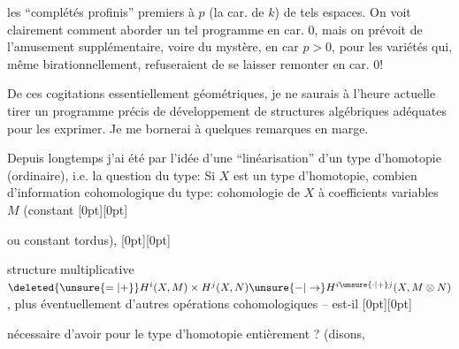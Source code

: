 %
les ``complétés profinis''  premiers à $p$ (la car. de $k$) de tels espaces. On voit clairement comment aborder un tel programme en car. $0$, mais on prévoit de l'amusement supplémentaire, voire du mystère, en car $p>0$, pour les variétés qui, même birationnellement, refuseraient de se laisser remonter en car. $0$!


De ces cogitations essentiellement géométriques, je ne saurais à l'heure actuelle tirer un programme précis de développement de structures algébriques adéquates pour les exprimer. Je me bornerai à quelques remarques en marge.

 Depuis longtemps j'ai été  par l'idée d'une ``linéarisation'' d'un type d'homotopie (ordinaire), i.e. la question du type: Si $X$ est un type d'homotopie, combien d'information cohomologique du type: cohomologie de $X$ à coefficients variables $M$ (constant%
\raisebox{-0.6ex}[0pt][0pt]{\parbox{0pt}{}} ou constant tordus),
\raisebox{2ex}[0pt][0pt]{\parbox{0pt}{}}structure multiplicative $\deleted{\unsure{=|+}}H^i(X,M)\times H^j(X,N)\unsure{-|\to}H^{i\unsure{\cdot|+}j}(X,M\otimes N)$, plus éventuellement d'autres opérations cohomologiques -- est-il%
\raisebox{0.4ex}[0pt][0pt]{\parbox{0pt}{}} nécessaire d'avoir pour  le type d'homotopie entièrement ? (disons,
